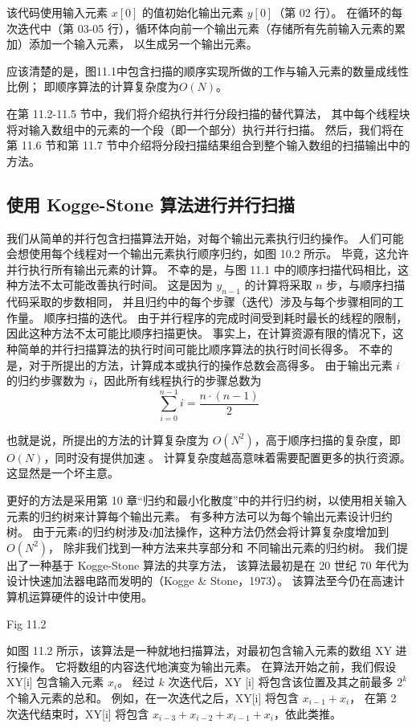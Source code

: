 该代码使用输入元素 $x[0]$ 的值初始化输出元素 $y[0]$（第 02 行）。 
在循环的每次迭代中（第 03-05 行），循环体向前一个输出元素（存储所有先前输入元素的累加）添加一个输入元素，
以生成另一个输出元素。

应该清楚的是，图11.1中包含扫描的顺序实现所做的工作与输入元素的数量成线性比例； 即顺序算法的计算复杂度为$O(N)$。

在第 11.2-11.5 节中，我们将介绍执行并行分段扫描的替代算法，
其中每个线程块将对输入数组中的元素的一个段（即一个部分）执行并行扫描。 
然后，我们将在第 11.6 节和第 11.7 节中介绍将分段扫描结果组合到整个输入数组的扫描输出中的方法。

\subsection{使用 Kogge-Stone 算法进行并行扫描}
我们从简单的并行包含扫描算法开始，对每个输出元素执行归约操作。 
人们可能会想使用每个线程对一个输出元素执行顺序归约，如图 10.2 所示。 毕竟，这允许并行执行所有输出元素的计算。 
不幸的是，与图 11.1 中的顺序扫描代码相比，这种方法不太可能改善执行时间。 
这是因为 $y_{n-1}$ 的计算将采取 $n$ 步，与顺序扫描代码采取的步数相同，
并且归约中的每个步骤（迭代）涉及与每个步骤相同的工作量。 顺序扫描的迭代。 
由于并行程序的完成时间受到耗时最长的线程的限制，因此这种方法不太可能比顺序扫描更快。 
事实上，在计算资源有限的情况下，这种简单的并行扫描算法的执行时间可能比顺序算法的执行时间长得多。 
不幸的是，对于所提出的方法，计算成本或执行的操作总数会高得多。 
由于输出元素 $i$ 的归约步骤数为 $i$，因此所有线程执行的步骤总数为
$$
\sum_{i=0}^{n-1} i=\frac{n \cdot(n-1)}{2}
$$

也就是说，所提出的方法的计算复杂度为 $O\left(N^{2}\right)$，高于顺序扫描的复杂度，即 $O(N)$，同时没有提供加速 。 
计算复杂度越高意味着需要配置更多的执行资源。 这显然是一个坏主意。

更好的方法是采用第 10 章“归约和最小化散度”中的并行归约树，以使用相关输入元素的归约树来计算每个输出元素。 
有多种方法可以为每个输出元素设计归约树。 
由于元素$i$的归约树涉及$i$加法操作，这种方法仍然会将计算复杂度增加到$O\left(N^{2}\right)$，
除非我们找到一种方法来共享部分和 不同输出元素的归约树。 
我们提出了一种基于 Kogge-Stone 算法的共享方法，
该算法最初是在 20 世纪 70 年代为设计快速加法器电路而发明的（Kogge \& Stone，1973）。 
该算法至今仍在高速计算机运算硬件的设计中使用。 

{\color{red} Fig 11.2}

如图 11.2 所示，该算法是一种就地扫描算法，对最初包含输入元素的数组 XY 进行操作。 
它将数组的内容迭代地演变为输出元素。 在算法开始之前，我们假设 XY[i] 包含输入元素 $x_{i}$。 
经过 $k$ 次迭代后，$\mathrm{XY}$ [i] 将包含该位置及其之前最多 $2^{k}$ 个输入元素的总和。 
例如，在一次迭代之后，XY[i] 将包含 $x_{i-1}+x_{i}$，
在第 2 次迭代结束时，XY[i] 将包含 $x_{i-3}+x_{ i-2}+x_{i-1}+x_{i}$，依此类推。

